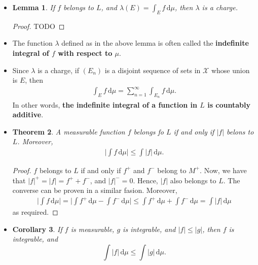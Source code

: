 \documentclass[10pt]{article}
\newtheorem{lemma}{Lemma}
\newtheorem{theorem}[lemma]{Theorem}
\newtheorem{corollary}[lemma]{Corollary}
\newcommand{\dee}{\mathrm{d}}
\newcommand{\mcal}[1]{\mathcal{#1}}
\begin{document}
\begin{itemize}
  \item \begin{lemma} \label{lemma:charge-from-integrable-function}
    If $f$ belongs to $L$, and $\lambda(E) = \int_E f\, \dee\mu$, then $\lambda$ is a charge.
  \end{lemma}

  \begin{proof}
    TODO
  \end{proof}

  \item The function $\lambda$ defined as in the above lemma is often called the {\bf indefinite integral of $f$ with respect to $\mu$}.
  
  \item Since $\lambda$ is a charge, if $(E_n)$ is a disjoint sequence of sets in $\mcal{X}$ whose union is $E$, then
  \begin{align*}
    \int_E f\, \dee\mu = \sum_{n=1}^\infty \int_{E_n} f\, \dee\mu.
  \end{align*}
  In other words, {\bf the indefinite integral of a function in $L$ is countably additive}.

  \item \begin{theorem} \label{theorem:absolute-integrability}
    A measurable function $f$ belongs fo $L$ if and only if $|f|$ belons to $L$. Moreover,
    \begin{align*}
      \bigg| \int f\, \dee\mu \bigg| \leq \int |f|\, \dee\mu.
    \end{align*}
  \end{theorem}

  \begin{proof}
    $f$ belongs to $L$ if and only if $f^+$ and $f^-$ belong to $M^+$. Now, we have that $|f|^+ = |f| = f^+ + f^-$, and $|f|^- = 0$. Hence, $|f|$ also belongs to $L$. The converse can be proven in a similar fasion. Moreover,
    \begin{align*}
      \bigg| \int f\, \dee\mu \bigg| 
      = \bigg| \int f^+\, \dee\mu - \int f^-\, \dee\mu \bigg|
      \leq  \int f^+\, \dee\mu + \int f^-\, \dee\mu
      = \int |f|\, \dee\mu
    \end{align*}
    as required.
  \end{proof}

  \item \begin{corollary}
    If $f$ is measurable, $g$ is integrable, and $|f| \leq |g|$, then $f$ is integrable, and $$\int |f|\, \dee\mu \leq \int |g|\, \dee\mu.$$
  \end{corollary}


\end{itemize}
\end{document}

